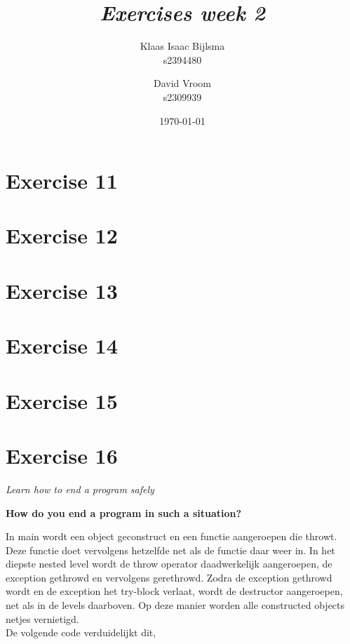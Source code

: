 \documentclass[12pt]{article}
\title{\itshape Exercises week 2}
\author{
	Klaas Isaac Bijlsma \\ s2394480
	\and
	David Vroom \\ s2309939
}
\date{\today}
\newcommand{\desc}[1]{\textit{#1} \vspace{1em}}
\begin{document}
\maketitle

\section*{Exercise 11}
\desc{}


\clearpage
\section*{Exercise 12}
\desc{}

\clearpage
\section*{Exercise 13}
\desc{}

\clearpage
\section*{Exercise 14}
\desc{}


\clearpage
\section*{Exercise 15}
\desc{}

\clearpage
\section*{Exercise 16}
\desc{Learn how to end a program safely}

\textbf{How do you end a program in such a situation?}

In main wordt een object geconstruct en een functie aangeroepen die throwt. Deze functie doet vervolgens hetzelfde net als de functie daar weer in. In het diepste nested level wordt de throw operator daadwerkelijk aangeroepen, de exception gethrowd en vervolgens gerethrowd. Zodra de exception gethrowd wordt en de exception het try-block verlaat, wordt de destructor aangeroepen, net als in de levels daarboven.
Op deze manier worden alle constructed objects netjes vernietigd.\\

De volgende code verduidelijkt dit,










\end{document}
